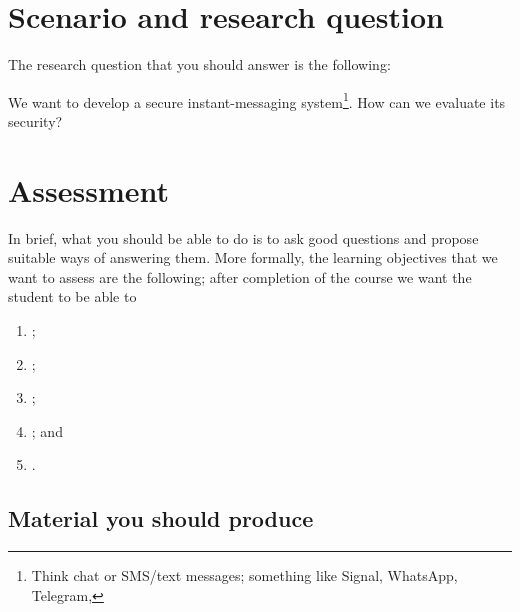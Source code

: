 \section{Scenario and research question}

The research question that you should answer is the following:
\begin{frame}
\begin{question}
  We want to develop a secure instant-messaging system\footnote{%
    Think chat or SMS/text messages; something like Signal, WhatsApp, Telegram, 
    \etc
  }.
  How can we evaluate its security?
\end{question}
\end{frame}

\section{Assessment}\label{Assessment}

In brief, what you should be able to do is to ask good questions and propose 
suitable ways of answering them.
More formally, the learning objectives that we want to assess are the 
following; after completion of the course we want the student to be able to
\begin{enumerate}[label={(LO\arabic*)},ref=LO\arabic*]
  \item \LOrelate*;
  \item \LOevaluate*;
  \item \LOapply*;
  \item \LOplan*; and
  \item \LOcomm*.
\end{enumerate}

\subsection{Material you should produce}

